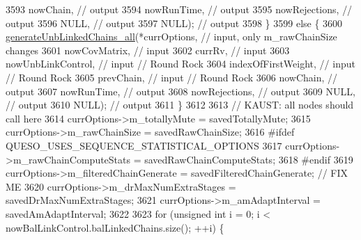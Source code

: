 \begin{DoxyCode}
3593                                       nowChain,           \textcolor{comment}{// output}
3594                                       nowRunTime,         \textcolor{comment}{// output}
3595                                       nowRejections,      \textcolor{comment}{// output}
3596                                       NULL,               \textcolor{comment}{// output}
3597                                       NULL);              \textcolor{comment}{// output}
3598         \}
3599         \textcolor{keywordflow}{else} \{
3600           \hyperlink{class_q_u_e_s_o_1_1_m_l_sampling_a04b0d797b321bb5c4047aab89a445e3c}{generateUnbLinkedChains\_all}(*currOptions,       \textcolor{comment}{// input, only
       m\_rawChainSize changes}
3601                                       nowCovMatrix,       \textcolor{comment}{// input}
3602                                       currRv,             \textcolor{comment}{// input}
3603                                       nowUnbLinkControl,  \textcolor{comment}{// input // Round Rock}
3604                                       indexOfFirstWeight, \textcolor{comment}{// input // Round Rock}
3605                                       prevChain,          \textcolor{comment}{// input // Round Rock}
3606                                       nowChain,           \textcolor{comment}{// output}
3607                                       nowRunTime,         \textcolor{comment}{// output}
3608                                       nowRejections,      \textcolor{comment}{// output}
3609                                       NULL,               \textcolor{comment}{// output}
3610                                       NULL);              \textcolor{comment}{// output}
3611         \}
3612 
3613         \textcolor{comment}{// KAUST: all nodes should call here}
3614         currOptions->m\_totallyMute           = savedTotallyMute;
3615         currOptions->m\_rawChainSize          = savedRawChainSize;
3616 \textcolor{preprocessor}{#ifdef QUESO\_USES\_SEQUENCE\_STATISTICAL\_OPTIONS}
3617 \textcolor{preprocessor}{}        currOptions->m\_rawChainComputeStats  = savedRawChainComputeStats;
3618 \textcolor{preprocessor}{#endif}
3619 \textcolor{preprocessor}{}        currOptions->m\_filteredChainGenerate = savedFilteredChainGenerate; \textcolor{comment}{// FIX ME}
3620         currOptions->m\_drMaxNumExtraStages   = savedDrMaxNumExtraStages;
3621         currOptions->m\_amAdaptInterval       = savedAmAdaptInterval;
3622 
3623         \textcolor{keywordflow}{for} (\textcolor{keywordtype}{unsigned} \textcolor{keywordtype}{int} i = 0; i < nowBalLinkControl.balLinkedChains.size(); ++i) \{

\end{DoxyCode}
